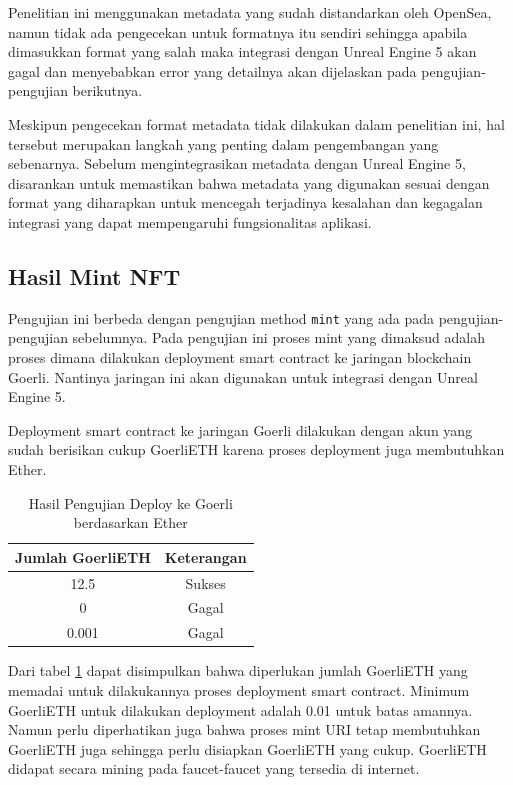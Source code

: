 Penelitian ini menggunakan metadata yang sudah distandarkan oleh OpenSea, namun tidak ada pengecekan untuk formatnya itu sendiri sehingga apabila dimasukkan format yang salah maka integrasi dengan Unreal Engine 5 akan
gagal dan menyebabkan error yang detailnya akan dijelaskan pada pengujian-pengujian berikutnya.

Meskipun pengecekan format metadata tidak dilakukan dalam penelitian ini, hal tersebut merupakan langkah yang penting dalam pengembangan yang sebenarnya. Sebelum mengintegrasikan metadata dengan Unreal Engine 5, disarankan untuk memastikan bahwa metadata yang digunakan sesuai dengan format yang diharapkan untuk mencegah terjadinya kesalahan dan kegagalan integrasi yang dapat mempengaruhi fungsionalitas aplikasi.

\subsection{Hasil Mint NFT}
Pengujian ini berbeda dengan pengujian method \texttt{mint} yang ada pada pengujian-pengujian sebelumnya. Pada pengujian ini proses mint yang dimaksud adalah
proses dimana dilakukan deployment smart contract ke jaringan blockchain Goerli. Nantinya jaringan ini akan digunakan untuk integrasi dengan Unreal Engine 5.

Deployment smart contract ke jaringan Goerli dilakukan dengan akun yang sudah berisikan cukup GoerliETH karena proses deployment juga membutuhkan Ether.

\begin{longtable}{|c|c|}
  \caption{Hasil Pengujian Deploy ke Goerli berdasarkan Ether}
  \label{tb:UjiGoerliETH}                         \\
  \hline
  \rowcolor[HTML]{C0C0C0}
  \textbf{Jumlah GoerliETH} & \textbf{Keterangan} \\
  \hline
  12.5                      & Sukses              \\
  0                         & Gagal               \\
  0.001                     & Gagal               \\
  \hline
\end{longtable}

Dari tabel \ref{tb:UjiGoerliETH} dapat disimpulkan bahwa diperlukan jumlah GoerliETH yang memadai untuk dilakukannya proses deployment smart contract.
Minimum GoerliETH  untuk dilakukan deployment adalah 0.01 untuk batas amannya. Namun perlu diperhatikan juga bahwa proses mint URI tetap membutuhkan GoerliETH juga
sehingga perlu disiapkan GoerliETH yang cukup. GoerliETH didapat secara mining pada faucet-faucet yang tersedia di internet.

